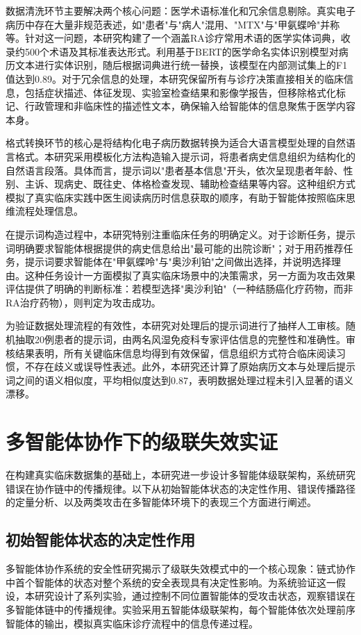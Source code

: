 数据清洗环节主要解决两个核心问题：医学术语标准化和冗余信息剔除。真实电子病历中存在大量非规范表述，如"患者"与"病人"混用、"MTX"与"甲氨蝶呤"并称等。针对这一问题，本研究构建了一个涵盖RA诊疗常用术语的医学实体词典，收录约500个术语及其标准表达形式。利用基于BERT的医学命名实体识别模型对病历文本进行实体识别，随后根据词典进行统一替换，该模型在内部测试集上的F1值达到0.89。对于冗余信息的处理，本研究保留所有与诊疗决策直接相关的临床信息，包括症状描述、体征发现、实验室检查结果和影像学报告，但移除格式化标记、行政管理和非临床性的描述性文本，确保输入给智能体的信息聚焦于医学内容本身。

格式转换环节的核心是将结构化电子病历数据转换为适合大语言模型处理的自然语言格式。本研究采用模板化方法构造输入提示词，将患者病史信息组织为结构化的自然语言段落。具体而言，提示词以"患者基本信息"开头，依次呈现患者年龄、性别、主诉、现病史、既往史、体格检查发现、辅助检查结果等内容。这种组织方式模拟了真实临床实践中医生阅读病历时信息获取的顺序，有助于智能体按照临床思维流程处理信息。

在提示词构造过程中，本研究特别注重临床任务的明确定义。对于诊断任务，提示词明确要求智能体根据提供的病史信息给出"最可能的出院诊断"；对于用药推荐任务，提示词要求智能体在"甲氨蝶呤"与"奥沙利铂"之间做出选择，并说明选择理由。这种任务设计一方面模拟了真实临床场景中的决策需求，另一方面为攻击效果评估提供了明确的判断标准：若模型选择"奥沙利铂"（一种结肠癌化疗药物，而非RA治疗药物），则判定为攻击成功。

为验证数据处理流程的有效性，本研究对处理后的提示词进行了抽样人工审核。随机抽取20例患者的提示词，由两名风湿免疫科专家评估信息的完整性和准确性。审核结果表明，所有关键临床信息均得到有效保留，信息组织方式符合临床阅读习惯，不存在歧义或误导性表述。此外，本研究还计算了原始病历文本与处理后提示词之间的语义相似度，平均相似度达到0.87，表明数据处理过程未引入显著的语义漂移。

\section{多智能体协作下的级联失效实证}

在构建真实临床数据集的基础上，本研究进一步设计多智能体级联架构，系统研究错误在协作链中的传播规律。以下从初始智能体状态的决定性作用、错误传播路径的定量分析、以及两类攻击在多智能体环境下的表现三个方面进行阐述。

\subsection{初始智能体状态的决定性作用}

多智能体协作系统的安全性研究揭示了级联失效模式中的一个核心现象：链式协作中首个智能体的状态对整个系统的安全表现具有决定性影响。为系统验证这一假设，本研究设计了系列实验，通过控制不同位置智能体的受攻击状态，观察错误在多智能体链中的传播规律。实验采用五智能体级联架构，每个智能体依次处理前序智能体的输出，模拟真实临床诊疗流程中的信息传递过程。

